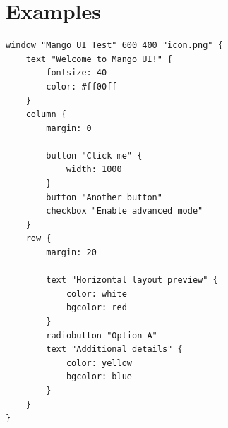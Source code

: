 \documentclass{article}
\begin{document}
\appendix
\section{Examples}
\begin{verbatim}
window "Mango UI Test" 600 400 "icon.png" {
    text "Welcome to Mango UI!" {
        fontsize: 40
        color: #ff00ff
    }
    column {
        margin: 0

        button "Click me" {
            width: 1000
        }
        button "Another button"
        checkbox "Enable advanced mode"
    }
    row {
        margin: 20

        text "Horizontal layout preview" {
            color: white
            bgcolor: red
        }
        radiobutton "Option A"
        text "Additional details" {
            color: yellow
            bgcolor: blue
        }
    }
}

\end{verbatim}
\end{document}
